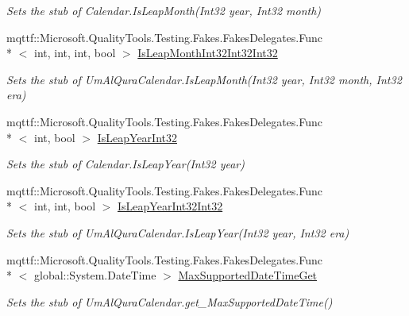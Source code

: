 \begin{DoxyCompactItemize}
\begin{DoxyCompactList}\small\item\em Sets the stub of Calendar.\-Is\-Leap\-Month(\-Int32 year, Int32 month)\end{DoxyCompactList}\item 
mqttf\-::\-Microsoft.\-Quality\-Tools.\-Testing.\-Fakes.\-Fakes\-Delegates.\-Func\\*
$<$ int, int, int, bool $>$ \hyperlink{class_system_1_1_globalization_1_1_fakes_1_1_stub_um_al_qura_calendar_a263ee5aad366b3dab80bc8180845ee8b}{Is\-Leap\-Month\-Int32\-Int32\-Int32}
\begin{DoxyCompactList}\small\item\em Sets the stub of Um\-Al\-Qura\-Calendar.\-Is\-Leap\-Month(\-Int32 year, Int32 month, Int32 era)\end{DoxyCompactList}\item 
mqttf\-::\-Microsoft.\-Quality\-Tools.\-Testing.\-Fakes.\-Fakes\-Delegates.\-Func\\*
$<$ int, bool $>$ \hyperlink{class_system_1_1_globalization_1_1_fakes_1_1_stub_um_al_qura_calendar_a005a692fbb7a400cc492e4eea4852998}{Is\-Leap\-Year\-Int32}
\begin{DoxyCompactList}\small\item\em Sets the stub of Calendar.\-Is\-Leap\-Year(\-Int32 year)\end{DoxyCompactList}\item 
mqttf\-::\-Microsoft.\-Quality\-Tools.\-Testing.\-Fakes.\-Fakes\-Delegates.\-Func\\*
$<$ int, int, bool $>$ \hyperlink{class_system_1_1_globalization_1_1_fakes_1_1_stub_um_al_qura_calendar_af6af8f1fdbb6de585508e9db5b37e4ef}{Is\-Leap\-Year\-Int32\-Int32}
\begin{DoxyCompactList}\small\item\em Sets the stub of Um\-Al\-Qura\-Calendar.\-Is\-Leap\-Year(\-Int32 year, Int32 era)\end{DoxyCompactList}\item 
mqttf\-::\-Microsoft.\-Quality\-Tools.\-Testing.\-Fakes.\-Fakes\-Delegates.\-Func\\*
$<$ global\-::\-System.\-Date\-Time $>$ \hyperlink{class_system_1_1_globalization_1_1_fakes_1_1_stub_um_al_qura_calendar_a2b64f3a076de2ddd5a2abfc2424719dc}{Max\-Supported\-Date\-Time\-Get}
\begin{DoxyCompactList}\small\item\em Sets the stub of Um\-Al\-Qura\-Calendar.\-get\-\_\-\-Max\-Supported\-Date\-Time()\end{DoxyCompactList}\item 

\end{DoxyCompactItemize}
